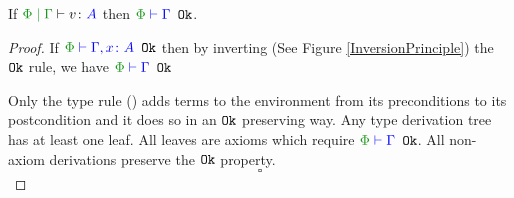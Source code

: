 \documentclass{Report}
\begin{document}
\begin{framed}
    
    \begin{lemma}
        If $\gpetyperelation{v}{A}$ then $\oke{\P}{\G}$.
    \end{lemma}
    \begin{proof}
        If $\oke{\P}{\gax}$ then by inverting (See Figure \ref{InversionPrinciple}) the $\texttt{Ok}$ rule, we have $\oke{\P}{\G}$ 
    
        Only the type rule (\textit{\envextend}) adds terms to the environment from its preconditions to its postcondition and it does so in an $\texttt{Ok}$ preserving way. Any type derivation tree has at least one leaf. All leaves are axioms which require $\oke{\P}{\G}$. All non-axiom derivations preserve the $\texttt{Ok}$ property.
        $$\square$$
    \end{proof}
    
\end{framed}
\end{document}
